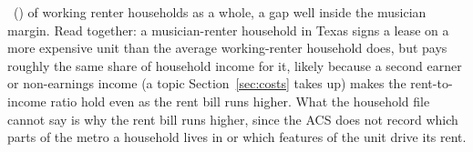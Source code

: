 \NPumsHhWorkerRentThreeZero\ (\NPumsHhWorkerRentThreeZeroMoe) of working
renter households as a whole, a gap well inside the musician margin. Read
together: a musician-renter household in Texas signs a lease on a more
expensive unit than the average working-renter household does, but pays
roughly the same share of household income for it, likely because a second
earner or non-earnings income (a topic Section~\ref{sec:costs} takes up)
makes the rent-to-income ratio hold even as the rent bill runs higher. What
the household file cannot say is why the rent bill runs higher, since the ACS
does not record which parts of the metro a household lives in or which
features of the unit drive its rent.
